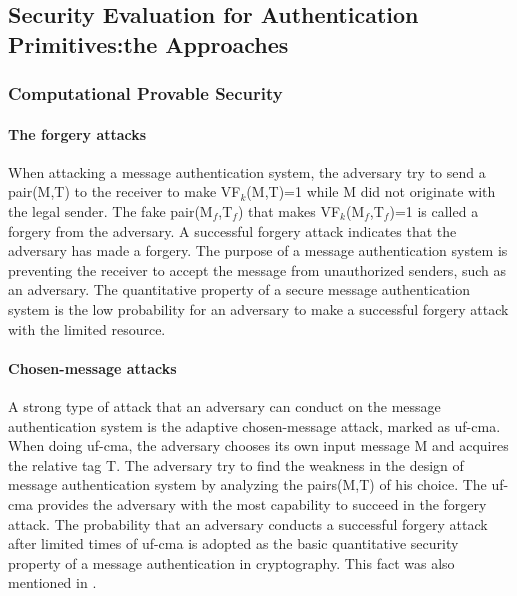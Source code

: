 \documentclass{article}
\begin{document}
\subsection{Security Evaluation for Authentication Primitives:the Approaches}
\subsubsection{Computational Provable Security}
\paragraph{The forgery attacks}
When attacking a message authentication system, the adversary try to send a pair(M,T) to the receiver to make VF$_k$(M,T)=1 while M did not originate with the legal sender. The fake pair(M$_f$,T$_f$) that makes VF$_k$(M$_f$,T$_f$)=1 is called a forgery from the adversary. A successful forgery attack indicates that the adversary has made a forgery. 
The purpose of a message authentication system is preventing the receiver to accept the message from unauthorized senders, such as an adversary. The quantitative property of a secure message authentication system is the low probability for an adversary to make a successful forgery attack with the limited resource.
\paragraph{Chosen-message attacks}
A strong type of attack that an adversary can conduct on the message authentication system is the adaptive chosen-message attack, marked as uf-cma. When doing uf-cma, the adversary chooses its own input message M and acquires the relative tag T. The adversary try to find the weakness in the design of message authentication system by analyzing the pairs(M,T) of his choice. The uf-cma provides the adversary with the most capability to succeed in the forgery attack. The probability that an adversary conducts a successful forgery attack after limited times of uf-cma is adopted as the basic quantitative security property of a message authentication in cryptography. This fact was also mentioned in \cite{Rogaway2011}.
\end{document}
